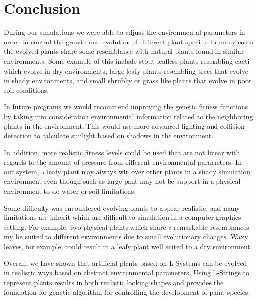 \documentclass[conference]{acmsiggraph}
\begin{document}
\section{Conclusion}

During our simulations we were able to adjust the environmental parameters in
order to control the growth and evolution of different plant species. In many
cases the evolved plants share some resemblance with natural plants found in
similar environments. Some example of this include stout leafless plants
resembling cacti which evolve in dry environments, large leafy plants resembling
trees that evolve in shady environments, and small shrubby or grass like plants
that evolve in poor soil conditions.

In future programs we would recommend improving the genetic fitness functions by
taking into consideration environmental information related to the neighboring
plants in the environment. This would use more advanced lighting and collision
detection to calculate sunlight based on shadows in the environment.

In addition, more realistic fitness levels could be used that are not linear
with regards to the amount of pressure from different environmental parameters.
In our system, a leafy plant may always win over other plants in a shady
simulation environment even though such as large pant may not be support in a
physical environment to do water or soil limitations.

Some difficulty was encountered evolving plants to appear realistic, and many
limitations are inherit which are difficult to simulation in a computer graphics
setting. For example, two physical plants which share a remarkable resemblances
my be suited to different environments due to small evolutionary changes. Waxy
leaves, for example, could result in a leafy plant well suited to a dry
environment.

Overall, we have shown that artificial plants based on L-Systems can be evolved
in realistic ways based on abstract environmental parameters. Using L-Strings to
represent plants results in both realistic looking shapes and provides the
foundation for genetic algorithm for controlling the development of plant
species.




\end{document}
